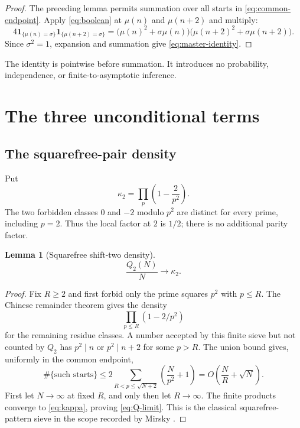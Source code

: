 \documentclass[11pt]{article}
\newtheorem{lemma}[theorem]{Lemma}
\theoremstyle{definition}
\theoremstyle{remark}
\newcommand{\Mob}{\mu}
\newcommand{\one}{\mathbf 1}
\begin{document}
\begin{proof}
The preceding lemma permits summation over all starts in
\eqref{eq:common-endpoint}.  Apply \eqref{eq:boolean} at $\Mob(n)$ and
$\Mob(n+2)$ and multiply:
\[
 4\one_{\{\Mob(n)=\sigma\}}\one_{\{\Mob(n+2)=\sigma\}}
 =\bigl(\Mob(n)^2+\sigma\Mob(n)\bigr)
  \bigl(\Mob(n+2)^2+\sigma\Mob(n+2)\bigr).
\]
Since $\sigma^2=1$, expansion and summation give
\eqref{eq:master-identity}.
\end{proof}

The identity is pointwise before summation.  It introduces no probability,
independence, or finite-to-asymptotic inference.

\section{The three unconditional terms}

\subsection{The squarefree-pair density}

Put
\begin{equation}
                    \kappa_2=\prod_p\left(1-\frac2{p^2}\right).
 \label{eq:kappa}
\end{equation}
The two forbidden classes $0$ and $-2$ modulo $p^2$ are distinct for every
prime, including $p=2$.  Thus the local factor at $2$ is $1/2$; there is no
additional parity factor.

\begin{lemma}[Squarefree shift-two density]
\begin{equation}
                         \frac{Q_2(N)}N\longrightarrow\kappa_2.
 \label{eq:Q-limit}
\end{equation}
\end{lemma}

\begin{proof}
Fix $R\ge2$ and first forbid only the prime squares $p^2$ with $p\le R$.
The Chinese remainder theorem gives the density
\[
                         \prod_{p\le R}(1-2/p^2)
\]
for the remaining residue classes.  A number accepted by this finite sieve
but not counted by $Q_2$ has $p^2\mid n$ or $p^2\mid n+2$ for some
$p>R$.  The union bound gives, uniformly in the common endpoint,
\[
 \#\{\text{such starts}\}
 \le 2\sum_{R<p\le\sqrt{N+2}}
       \left(\frac{N}{p^2}+1\right)
 =O\!\left(\frac NR+\sqrt N\right).
\]
First let $N\to\infty$ at fixed $R$, and only then let $R\to\infty$.
The finite products converge to \eqref{eq:kappa}, proving
\eqref{eq:Q-limit}.  This is the classical squarefree-pattern sieve in the
scope recorded by Mirsky \cite{Mirsky1948}.
\end{proof}
\end{document}
